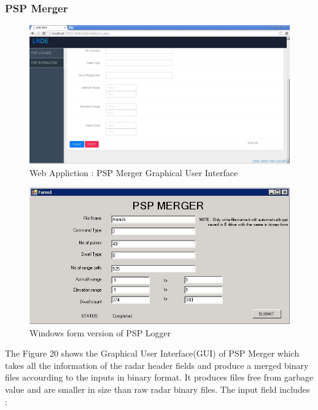 \documentclass[14pt]{article} %
\begin{document}
  \subsubsection{PSP Merger}
    \begin{figure}[H]
  \centerline{\includegraphics[width=\linewidth]{extractor2.jpg}}
  \caption{Web Appliction : PSP Merger Graphical User Interface}
  \label{fig:figure 20}
\end{figure}  
 \begin{figure}[H]
  \centerline{\includegraphics[width=\linewidth]{PSPmerger.jpg}}
  \caption{Windows form version of PSP Logger}
  \label{fig:figure 21}
  \end{figure}
 The Figure 20 shows the Graphical User Interface(GUI) of PSP Merger which takes all the information of the radar header fields and produce a merged binary files accourding to the inputs  in binary format. It produces files free from garbage value and are smaller in size than raw radar binary files.
  The input field includes :
\end{document}
